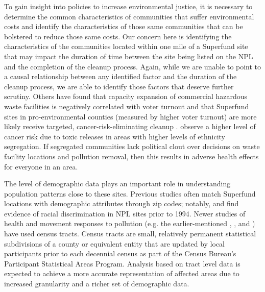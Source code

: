 \documentclass[12pt]{article}
\begin{document}
To gain insight into policies to increase environmental justice, it is necessary to determine the common characteristics of communities that suffer environmental costs and identify the characteristics of those same communities that can be bolstered to reduce those same costs. Our concern here is identifying the characteristics of the communities located within one mile of a Superfund site that may impact the duration of time between the site being listed on the NPL and the completion of the cleanup process. Again, while we are unable to point to a causal relationship between any identified factor and the duration of the cleanup process, we are able to identify those factors that deserve further scrutiny. Others have found that capacity expansion of commercial hazardous waste facilities is negatively correlated with voter turnout \parencite{Hamilton1995} and that Superfund sites in pro-environmental counties (measured by higher voter turnout) are more likely receive targeted, cancer-risk-eliminating cleanup \parencite{hamilton1999calculating}. \textcite{Morello-Frosch2006} observe a higher level of cancer risk due to toxic releases in areas with higher levels of ethnicity segregation. If segregated communities lack political clout over decisions on waste facility locations and pollution removal, then this results in adverse health effects for everyone in an area. 

The level of demographic data plays an important role in understanding population patterns close to these sites. Previous studies often match Superfund locations with demographic attributes through zip codes; notably, \textcite{burda2014environmental} and find evidence of racial discrimination in NPL sites prior to 1994. Newer studies of health and movement responses to pollution (e.g. the earlier-mentioned \textcite{Morello-Frosch2006}, \textcite{Gamper-Rabindran2013}, and \textcite{Depro2015}) have used census tracts. Census tracts are small, relatively permanent statistical subdivisions of a county or equivalent entity that are updated by local participants prior to each decennial census as part of the Census Bureau's Participant Statistical Areas Program. Analysis based on tract level data is expected to achieve a more accurate representation of affected areas due to increased granularity \parencite{ProximityOne2019} and a richer set of demographic data.

\end{document}

